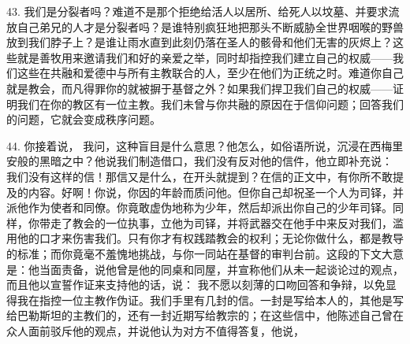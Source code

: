 43. 我们是分裂者吗？难道不是那个拒绝给活人以居所、给死人以坟墓、并要求流放自己弟兄的人才是分裂者吗？是谁特别疯狂地把那头不断威胁全世界咽喉的野兽放到我们脖子上？是谁让雨水直到此刻仍落在圣人的骸骨和他们无害的灰烬上？这些就是善牧用来邀请我们和好的亲爱之举，同时却指控我们建立自己的权威——我们这些在共融和爱德中与所有主教联合的人，至少在他们为正统之时。难道你自己就是教会，而凡得罪你的就被摒于基督之外？如果我们捍卫我们自己的权威——证明我们在你的教区有一位主教。我们未曾与你共融的原因在于信仰问题；回答我们的问题，它就会变成秩序问题。\par

44. 你接着说， 我问，这种盲目是什么意思？他怎么，如俗语所说，沉浸在西梅里安般的黑暗之中？他说我们制造借口，我们没有反对他的信件，他立即补充说： 我们没有这样的信！那信又是什么，在开头就提到？在信的正文中，有你所不敢提及的内容。好啊！你说，你因的年龄而质问他。但你自己却祝圣一个人为司铎，并派他作为使者和同僚。你竟敢虚伪地称为少年，然后却派出你自己的少年司铎。同样，你带走了教会的一位执事，立他为司铎，并将武器交在他手中来反对我们，滥用他的口才来伤害我们。只有你才有权践踏教会的权利；无论你做什么，都是教导的标准；而你竟毫不羞愧地挑战，与你一同站在基督的审判台前。这段的下文大意是：他当面责备，说他曾是他的同桌和同屋，并宣称他们从未一起谈论过的观点，而且他以宣誓作证来支持他的话，说： 我不愿以刻薄的口吻回答和争辩，以免显得我在指控一位主教作伪证。我们手里有几封的信。一封是写给本人的，其他是写给巴勒斯坦的主教们的，还有一封近期写给教宗的；在这些信中，他陈述自己曾在众人面前驳斥他的观点，并说他认为对方不值得答复，他说，\par


